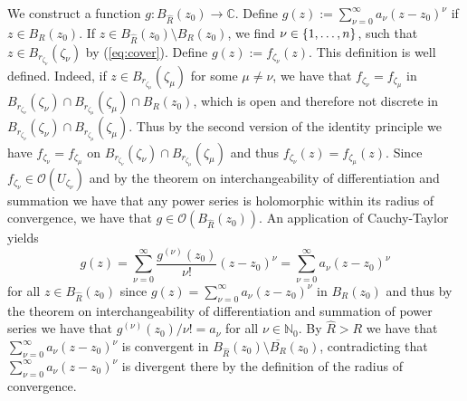\begin{enumerate}[label = \textbf{Exercise \arabic*.},wide = 0pt, itemsep=1.5ex]
		We construct a function $g: B_{\widehat{R}}(z_0) \to \mathbb{C}$. Define $g(z) := \sum_{\nu = 0}^\infty a_\nu (z - z_0)^\nu$ if $z \in B_R(z_0)$. If $z \in B_{\widehat{R}}(z_0) \setminus B_R(z_0)$, we find $\nu \in \cbr[0]{1,\dots,n}$, such that $z \in B_{r_{\zeta_\nu}}(\zeta_\nu)$ by (\ref{eq:cover}). Define $g(z) := f_{\zeta_\nu}(z)$. This definition is well defined. Indeed, if $z \in B_{r_{\zeta_\mu}}(\zeta_\mu)$ for some $\mu \neq \nu$, we have that $f_{\zeta_\nu} = f_{\zeta_\mu}$ in $B_{r_{\zeta_\nu}}(\zeta_\nu) \cap B_{r_{\zeta_\mu}}(\zeta_\mu) \cap B_R(z_0)$, which is open and therefore not discrete in $B_{r_{\zeta_\nu}}(\zeta_\nu) \cap B_{r_{\zeta_\mu}}(\zeta_\mu)$. Thus by the second version of the identity principle we have $f_{\zeta_\nu} = f_{\zeta_{\mu}}$ on $B_{r_{\zeta_\nu}}(\zeta_\nu) \cap B_{r_{\zeta_\mu}}(\zeta_\mu)$ and thus $f_{\zeta_\nu}(z) = f_{\zeta_\mu}(z)$. Since $f_{\zeta_\nu} \in \mathcal{O}(U_{\zeta_\nu})$ and by the theorem on interchangeability of differentiation and summation we have that any power series is holomorphic within its radius of convergence, we have that $g \in \mathcal{O}(B_{\widehat{R}}(z_0))$. An application of Cauchy-Taylor yields
		\begin{equation}
			g(z) = \sum_{\nu = 0}^\infty \frac{g^{(\nu)}(z_0)}{\nu !}(z - z_0)^\nu = \sum_{\nu = 0}^\infty a_\nu(z - z_0)^\nu
		\end{equation}
		\noindent for all $z \in B_{\widehat{R}}(z_0)$ since $g(z) = \sum_{\nu = 0}^\infty a_\nu (z - z_0)^\nu$ in $B_R(z_0)$ and thus by the theorem on interchangeability of differentiation and summation of power series we have that $g^{(\nu)}(z_0)/\nu! = a_\nu$ for all $\nu \in \mathbb{N}_0$. By $\widehat{R} > R$ we have that $\sum_{\nu = 0}^\infty a_\nu(z - z_0)^\nu$ is convergent in $B_{\widehat{R}}(z_0) \setminus \overline{B_R}(z_0)$, contradicting that $\sum_{\nu = 0}^\infty a_{\nu} (z - z_0)^\nu$ is divergent there by the definition of the radius of convergence. 


\end{enumerate}
